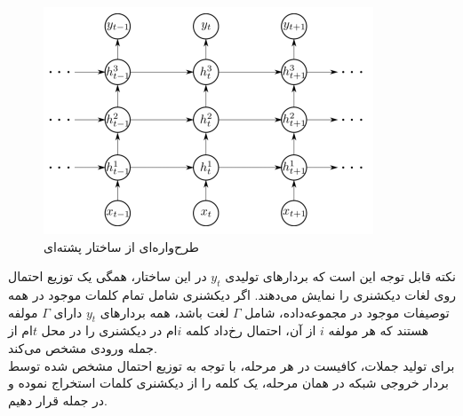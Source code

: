 \begin{figure}[h]
	\centering
	\includegraphics[scale=0.7]{Imgs/stackedLstm.png}
	\caption{طرح‌واره‌ای از ساختار \lstm پشته‌ای}
	\label{fig:stackedLstm}
\end{figure}

نکته قابل توجه این است که بردارهای تولیدی $y_t$ در این ساختار، همگی یک توزیع احتمال روی لغات دیکشنری را نمایش می‌دهند. اگر دیکشنری شامل تمام کلمات موجود در همه توصیفات موجود در مجموعه‌داده، شامل $\Gamma$ لغت باشد، همه بردارهای $y_t$ دارای $\Gamma$‌ مولفه هستند که هر مولفه $i$ از آن، احتمال رخ‌داد کلمه $i$ام در دیکشنری را در محل $t$ام از جمله ورودی مشخص می‌کند.
\\
برای تولید جملات، کافیست در هر مرحله، با توجه به توزیع احتمال مشخص‌ شده توسط بردار خروجی شبکه در همان مرحله،‌ یک کلمه را از دیکشنری کلمات استخراج نموده و در جمله قرار دهیم.
\\

